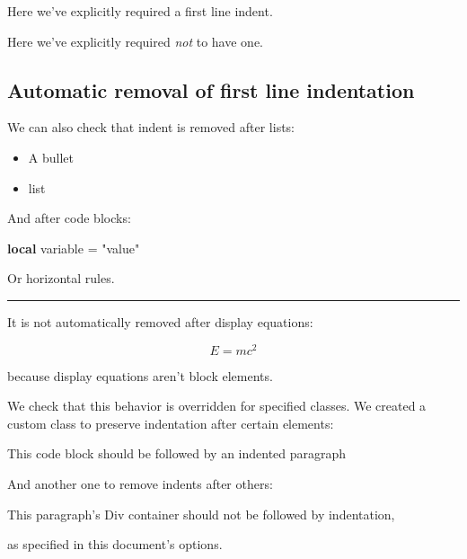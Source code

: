 \documentclass[
  letterpaper,
  DIV=11,
  numbers=noendperiod]{scrartcl}
\newenvironment{Shaded}{\begin{snugshade}}{\end{snugshade}}
\newcommand{\KeywordTok}[1]{\textcolor[rgb]{0.00,0.23,0.31}{\textbf{#1}}}
\newcommand{\NormalTok}[1]{\textcolor[rgb]{0.00,0.23,0.31}{#1}}
\newcommand{\OperatorTok}[1]{\textcolor[rgb]{0.37,0.37,0.37}{#1}}
\newcommand{\StringTok}[1]{\textcolor[rgb]{0.13,0.47,0.30}{#1}}
\newcommand{\VariableTok}[1]{\textcolor[rgb]{0.07,0.07,0.07}{#1}}
\providecommand{\tightlist}{%
  \setlength{\itemsep}{0pt}\setlength{\parskip}{0pt}}
\begin{document}
\indent Here we've explicitly required a first line indent.

\noindent Here we've explicitly required \emph{not} to have one.

\subsection{Automatic removal of first line
indentation}\label{automatic-removal-of-first-line-indentation}

We can also check that indent is removed after lists:

\begin{itemize}
\tightlist
\item
  A bullet
\item
  list
\end{itemize}

\noindent And after code blocks:

\begin{Shaded}
\begin{Highlighting}[]
\KeywordTok{local} \VariableTok{variable} \OperatorTok{=} \StringTok{"value"}
\end{Highlighting}
\end{Shaded}

\noindent Or horizontal rules.

\begin{center}\rule{0.5\linewidth}{0.5pt}\end{center}

\noindent It is not automatically removed after display equations:

\[E = mc^2\]

because display equations aren't block elements.

We check that this behavior is overridden for specified classes. We
created a custom class to preserve indentation after certain elements:

\begin{Shaded}
\begin{Highlighting}[]
\NormalTok{This code block }
\NormalTok{should be followed }
\NormalTok{by an indented }
\NormalTok{paragraph}
\end{Highlighting}
\end{Shaded}

And another one to remove indents after others:

This paragraph's Div container should not be followed by indentation,

\noindent as specified in this document's options.
\end{document}

